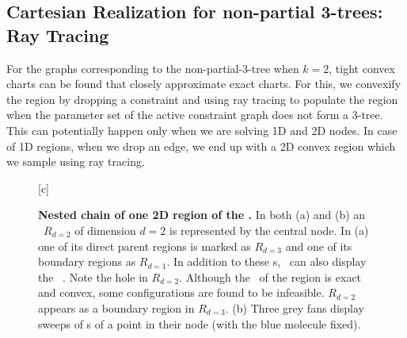 \subsection{Cartesian Realization for non-partial 3-trees: Ray Tracing}
For the graphs corresponding to the non-partial-3-tree
when $k = 2$, tight convex charts can be found that closely approximate
exact charts. For this, we convexify the region by dropping a constraint and
using ray tracing to populate the region when the parameter set of the active
constraint graph does not form a 3-tree. This can potentially happen only when
we are solving 1D and 2D nodes. In case of 1D regions, when we drop
an edge, we end up with a 2D convex region which we sample using ray tracing.


\def\wid{0.45\linewidth}
\begin{figure}
 \centering
 [c]{\hskip1cm\acg}
 \linewidth
 \caption{\footnotesize {\bf Nested chain of one 2D region of the \atlas.}
 In both (a) and (b) an \acr\ $R_{d=2}$ of dimension
 $d=2$ is represented by the central node.
 In (a) one of its direct parent regions is marked as $R_{d=3}$ and
 one of its boundary regions as $R_{d=1}$.
 In addition to these \chart s, \EASAL~can also display
 the \acgW\ \acg. Note the hole in $R_{d=2}$.
 Although the \chart\ of the region is exact and convex,
 some configurations are found to be infeasible.
 $R_{d=2}$ appears as a boundary region in $R_{d=3}$.
 (b)
 Three grey fans display sweeps of \Cr s of a point in their node (with the blue
 molecule fixed).
 }
\end{figure}


